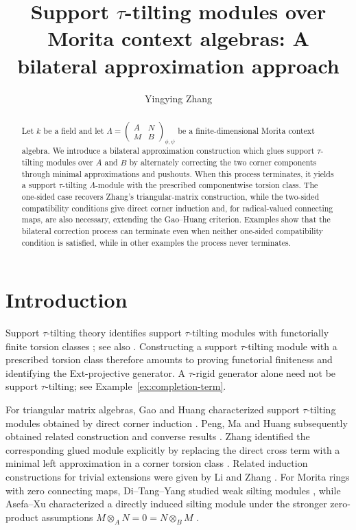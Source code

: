 \documentclass[11pt,reqno]{amsart}
\title[Support $\tau$-tilting modules over Morita contexts]
{Support $\tau$-tilting modules over Morita context algebras: A bilateral approximation approach}
\author[Yingying Zhang]{Yingying Zhang}
\date{}
\theoremstyle{definition}
\theoremstyle{remark}
\numberwithin{equation}{section}
\begin{document}
\begin{abstract}
Let $k$ be a field and let
$\Lambda=\left(\begin{smallmatrix}A&N\\M&B\end{smallmatrix}\right)_{\phi,\psi}$
be a finite-dimensional Morita context algebra.  We introduce a bilateral
approximation construction which glues support $\tau$-tilting modules over
$A$ and $B$ by alternately correcting the two corner components through
minimal approximations and pushouts.  When this process terminates, it yields
a support $\tau$-tilting $\Lambda$-module with the prescribed componentwise
torsion class.  The one-sided case recovers Zhang's triangular-matrix
construction, while the two-sided compatibility conditions give direct
corner induction and, for radical-valued connecting maps, are also necessary,
extending the Gao--Huang criterion.  Examples show that the bilateral
correction process can terminate even when neither one-sided compatibility
condition is satisfied, while in other examples the process never terminates.
\end{abstract}


\maketitle
\enlargethispage{2pt}

\section{Introduction}

Support $\tau$-tilting theory identifies support $\tau$-tilting
modules with functorially finite torsion classes
\cite[Theorem~2.7]{AIR}; see also \cite[Theorem~2.11]{Jasso}.
Constructing a support $\tau$-tilting module with a prescribed torsion class
therefore amounts to proving functorial finiteness and identifying the
Ext-projective generator.  A $\tau$-rigid generator alone need not be
support $\tau$-tilting; see Example~\ref{ex:completion-term}.

For triangular matrix algebras, Gao and Huang characterized support
$\tau$-tilting modules obtained by direct corner induction
\cite{GaoHuang}.  Peng, Ma and Huang subsequently obtained related
construction and converse results \cite{PengMaHuang}.  Zhang identified the
corresponding glued module explicitly by replacing the direct cross term with
a minimal left approximation in a corner torsion class
\cite[Theorem~5.1]{Zhang}.  Related induction constructions for trivial
extensions were given by Li and Zhang \cite{LiZhang}.  For Morita rings with
zero connecting maps, Di--Tang--Yang studied weak silting modules
\cite{DiTangYang}, while Asefa--Xu characterized a directly induced silting
module under the stronger zero-product assumptions
$M\otimes_AN=0=N\otimes_BM$ \cite[Theorem~3.4]{AsefaXu}.
\end{document}
